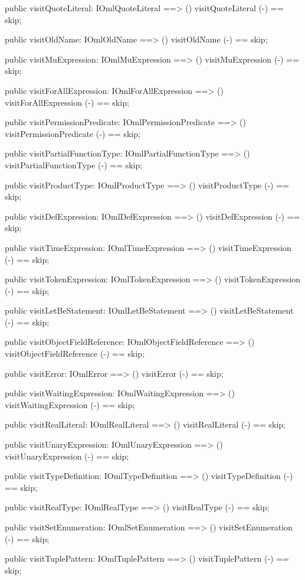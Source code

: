 \begin{vdm_al}
  public visitQuoteLiteral: IOmlQuoteLiteral ==> ()
  visitQuoteLiteral (-) == skip;

  public visitOldName: IOmlOldName ==> ()
  visitOldName (-) == skip;

  public visitMuExpression: IOmlMuExpression ==> ()
  visitMuExpression (-) == skip;

  public visitForAllExpression: IOmlForAllExpression ==> ()
  visitForAllExpression (-) == skip;

  public visitPermissionPredicate: IOmlPermissionPredicate ==> ()
  visitPermissionPredicate (-) == skip;

  public visitPartialFunctionType: IOmlPartialFunctionType ==> ()
  visitPartialFunctionType (-) == skip;

  public visitProductType: IOmlProductType ==> ()
  visitProductType (-) == skip;

  public visitDefExpression: IOmlDefExpression ==> ()
  visitDefExpression (-) == skip;

  public visitTimeExpression: IOmlTimeExpression ==> ()
  visitTimeExpression (-) == skip;

  public visitTokenExpression: IOmlTokenExpression ==> ()
  visitTokenExpression (-) == skip;

  public visitLetBeStatement: IOmlLetBeStatement ==> ()
  visitLetBeStatement (-) == skip;

  public visitObjectFieldReference: IOmlObjectFieldReference ==> ()
  visitObjectFieldReference (-) == skip;

  public visitError: IOmlError ==> ()
  visitError (-) == skip;

  public visitWaitingExpression: IOmlWaitingExpression ==> ()
  visitWaitingExpression (-) == skip;

  public visitRealLiteral: IOmlRealLiteral ==> ()
  visitRealLiteral (-) == skip;

  public visitUnaryExpression: IOmlUnaryExpression ==> ()
  visitUnaryExpression (-) == skip;

  public visitTypeDefinition: IOmlTypeDefinition ==> ()
  visitTypeDefinition (-) == skip;

  public visitRealType: IOmlRealType ==> ()
  visitRealType (-) == skip;

  public visitSetEnumeration: IOmlSetEnumeration ==> ()
  visitSetEnumeration (-) == skip;

  public visitTuplePattern: IOmlTuplePattern ==> ()
  visitTuplePattern (-) == skip;


\end{vdm_al}
